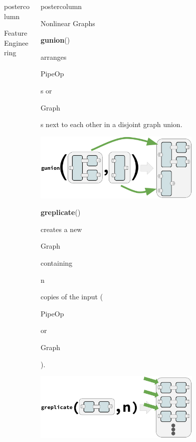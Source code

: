 \documentclass{beamer}
\newlength{\columnheight} %
\newcommand{\codeinline}[1]{\begin{codeboxinline}#1\end{codeboxinline}}
\begin{document}
\begin{frame}[fragile]{}
\begin{columns}
\begin{column}{.245\textwidth}
\begin{beamercolorbox}[center]{postercolumn}
\begin{minipage}{.98\textwidth}
{\begin{myblock}{Feature Engineering}
\begin{codeboxexample}
{                }
              \end{codeboxexample}
            \end{myblock}
            \vspace{-1.0em}
            \vfill}
        \end{minipage}
      \end{beamercolorbox}
    \end{column}
    \begin{column}{.245\textwidth}
      \begin{beamercolorbox}[center]{postercolumn}
        \begin{minipage}{.98\textwidth}
          \parbox[t][\columnheight]{\textwidth}{
            \begin{myblock}{Nonlinear Graphs}
              \codeinline{\textbf{gunion}()} arranges \codeinline{PipeOp}s or \codeinline{Graph}s next to each other in a disjoint graph union.
              \\
              \begin{center}
                \includegraphics[width=0.7\textwidth]{img/gunion.pdf}
              \end{center}
              \vspace{0.3em}
              \codeinline{\textbf{greplicate}()} creates a new \codeinline{Graph} containing \codeinline{n} copies of the input (\codeinline{PipeOp} or \codeinline{Graph}).
              \\
              \begin{center}
                \includegraphics[width=0.7\textwidth]{img/greplicate.pdf}

\end{center}
\end{myblock}}
\end{minipage}
\end{beamercolorbox}
\end{column}
\end{columns}
\end{frame}
\end{document}
